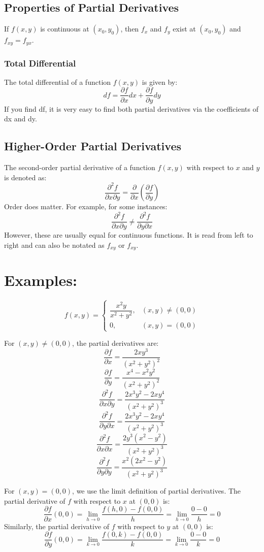 \documentclass[a4paper,12pt,openany]{book}
\newcommand{\pd}[2]{\dfrac{\partial #1}{\partial #2}}
\newcommand{\pdm}[3]{\dfrac{\partial^2 #1}{\partial #2 \partial #3}}
\begin{document}
\subsection{Properties of Partial Derivatives}
If $f(x,y)$ is continuous at $(x_0, y_0)$, then $f_x$ and $f_y$ exist at $(x_0, y_0)$ and $f_{xy} = f_{yx}$.

\subsubsection{Total Differential}
The total differential of a function \(f(x, y)\) is given by:
\[
    df = \pd{f}{x}dx + \pd{f}{y}dy
\]
If you find df, it is very easy to find both partial derivatives via the coefficients of dx and dy.
\subsection{Higher-Order Partial Derivatives}
The second-order partial derivative of a function \(f(x, y)\) with respect to \(x\) and \(y\) is denoted as:
\[
    \pdm{f}{x}{y} = \pd{}{x}\left(\pd{f}{y}\right)
\]
Order does matter. For example, for some instances: \[\pdm{f}{x}{y} \neq \pdm{f}{y}{x}\] However, these are usually equal for continuous functions. It is read from left to right and can also be notated as \(f_{xy}\) or \(f_{xy}\).
\pagebreak
\section{Examples:}
\[
    f(x, y) = 
    \begin{cases}
        \dfrac{x^2 y}{x^2 + y^2}, & (x, y) \neq (0, 0)\\
        0, & (x, y) = (0, 0)
    \end{cases}
\]

For \( (x, y) \neq (0, 0) \), the partial derivatives are:
\[
    \pd{f}{x} = \dfrac{2xy^3}{(x^2 + y^2)^2}
\]
\[
    \pd{f}{y} = \dfrac{x^4 - x^2 y^2}{(x^2 + y^2)^2}
\]
\[
    \pdm{f}{x}{y} = \dfrac{2x^3 y^2 - 2x y^4}{(x^2 + y^2)^3}
\]
\[
    \pdm{f}{y}{x} = \dfrac{2x^3 y^2 - 2x y^4}{(x^2 + y^2)^3}
\]
\[
    \pdm{f}{x}{x} = \dfrac{2y^3(x^2 - y^2)}{(x^2 + y^2)^3}
\]
\[
    \pdm{f}{y}{y} = \dfrac{x^2(2x^2 - y^2)}{(x^2 + y^2)^3}
\]

For \( (x, y) = (0, 0) \), we use the limit definition of partial derivatives. The partial derivative of \( f \) with respect to \( x \) at \( (0, 0) \) is:
\[
    \pd{f}{x}(0, 0) = \lim_{h \to 0} \dfrac{f(h, 0) - f(0, 0)}{h} = \lim_{h \to 0} \dfrac{0 - 0}{h} = 0
\]
Similarly, the partial derivative of \( f \) with respect to \( y \) at \( (0, 0) \) is:
\[
    \pd{f}{y}(0, 0) = \lim_{k \to 0} \dfrac{f(0, k) - f(0, 0)}{k} = \lim_{k \to 0} \dfrac{0 - 0}{k} = 0
\]
\end{document}
